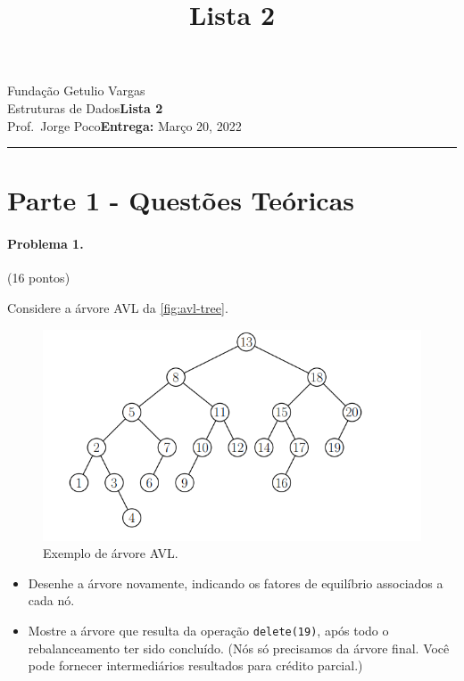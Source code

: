 \documentclass{article}
\title{Lista 2}
\date{}
\newcommand{\assignment}{Lista 2}
\newcommand{\duedate}{Março 20, 2022}
\begin{document}
Fundação Getulio Vargas\hfill\\
Estruturas de Dados\hfill\textbf{\assignment}\\
Prof.\ Jorge Poco\hfill\textbf{Entrega:} \duedate\\
\smallskip\hrule\bigskip

{\let\newpage\relax\maketitle}
\maketitle

\section*{Parte 1 - Questões Teóricas}
\paragraph{Problema 1.} (16 pontos)

Considere a árvore AVL da \autoref{fig:avl-tree}.

\begin{figure}[h]
    \centering
    \includegraphics[width = 0.7\linewidth]{figures/fig-1.png}
    \caption{Exemplo de árvore AVL.}
    \label{fig:avl-tree}
\end{figure}

\begin{itemize}
    \item Desenhe a árvore novamente, indicando os fatores de equilíbrio associados a cada nó.
    \item Mostre a árvore que resulta da operação \texttt{delete(19)}, após todo o rebalanceamento ter sido concluído. (Nós só precisamos da árvore final. Você pode fornecer intermediários resultados para crédito parcial.) 
\end{itemize}
\end{document}
